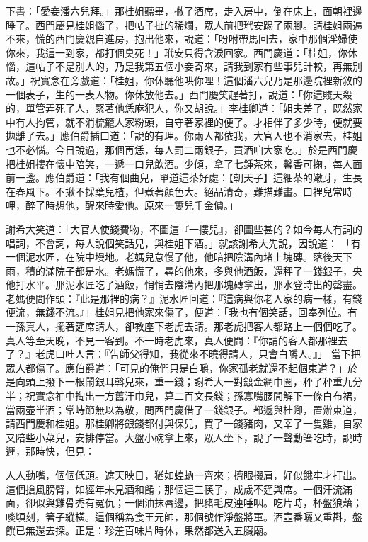 下書：「愛妾潘六兒拜。」那桂姐聽畢，撇了酒席，走入房中，倒在床上，面朝裡邊睡了。西門慶見桂姐惱了，把帖子扯的稀爛，眾人前把玳安踢了兩腳。請桂姐兩遍不來，慌的西門慶親自進房，抱出他來，說道：「吩咐帶馬回去，家中那個淫婦使你來，我這一到家，都打個臭死！」玳安只得含淚回家。西門慶道：「桂姐，你休惱，這帖子不是別人的，乃是我第五個小妾寄來，請我到家有些事兒計較，再無別故。」祝實念在旁戲道：「桂姐，你休聽他哄你哩！這個潘六兒乃是那邊院裡新敘的一個表子，生的一表人物。你休放他去。」西門慶笑趕著打，說道：「你這賤天殺的，單管弄死了人，緊著他恁麻犯人，你又胡說。」李桂卿道：「姐夫差了，既然家中有人拘管，就不消梳籠人家粉頭，自守著家裡的便了。才相伴了多少時，便就要拋離了去。」應伯爵插口道：「說的有理。你兩人都依我，大官人也不消家去，桂姐也不必惱。今日說過，那個再恁，每人罰二兩銀子，買酒咱大家吃。」於是西門慶把桂姐摟在懷中陪笑，一遞一口兒飲酒。少傾，拿了七鍾茶來，馨香可掬，每人面前一盞。應伯爵道：「我有個曲兒，單道這茶好處：【朝天子】這細茶的嫩芽，生長在春風下。不揪不採葉兒楂，但煮著顏色大。絕品清奇，難描難畫。口裡兒常時呷，醉了時想他，醒來時愛他。原來一簍兒千金價。」

謝希大笑道：「大官人使錢費物，不圖這『一摟兒』，卻圖些甚的？如今每人有詞的唱詞，不會詞，每人說個笑話兒，與桂姐下酒。」就該謝希大先說，因說道： 「有一個泥水匠，在院中墁地。老媽兒怠慢了他，他暗把陰溝內堵上塊磚。落後天下雨，積的滿院子都是水。老媽慌了，尋的他來，多與他酒飯，還秤了一錢銀子，央他打水平。那泥水匠吃了酒飯，悄悄去陰溝內把那塊磚拿出，那水登時出的罄盡。老媽便問作頭：『此是那裡的病？』泥水匠回道：『這病與你老人家的病一樣，有錢便流，無錢不流。』」桂姐見把他家來傷了，便道：「我也有個笑話，回奉列位。有一孫真人，擺著筵席請人，卻教座下老虎去請。那老虎把客人都路上一個個吃了。真人等至天晚，不見一客到。不一時老虎來，真人便問：『你請的客人都那裡去了？』老虎口吐人言：『告師父得知，我從來不曉得請人，只會白嚼人。』」 當下把眾人都傷了。應伯爵道：「可見的俺們只是白嚼，你家孤老就還不起個東道？」於是向頭上撥下一根鬧銀耳斡兒來，重一錢；謝希大一對鍍金網巾圈，秤了秤重九分半；祝實念袖中掏出一方舊汗巾兒，算二百文長錢；孫寡嘴腰間解下一條白布裙，當兩壺半酒；常峙節無以為敬，問西門慶借了一錢銀子。都遞與桂卿，置辦東道，請西門慶和桂姐。那桂卿將銀錢都付與保兒，買了一錢豬肉，又宰了一隻雞，自家又陪些小菜兒，安排停當。大盤小碗拿上來，眾人坐下，說了一聲動箸吃時，說時遲，那時快，但見：

人人動嘴，個個低頭。遮天映日，猶如蝗蚋一齊來；擠眼掇肩，好似餓牢才打出。這個搶風膀臂，如經年未見酒和餚；那個連三筷子，成歲不筵與席。一個汗流滿面，卻似與雞骨禿有冤仇；一個油抹唇邊，把豬毛皮連唾咽。吃片時，杯盤狼藉；啖頃刻，箸子縱橫。這個稱為食王元帥，那個號作淨盤將軍。酒壺番曬又重斟，盤饌已無還去探。正是：珍羞百味片時休，果然都送入五臟廟。

